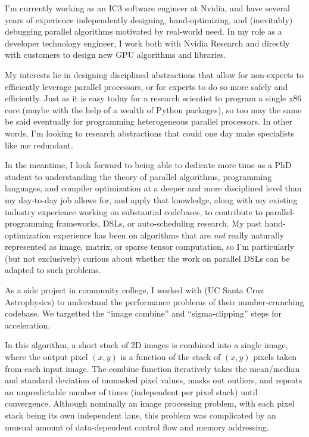 


\raggedright
\reversemarginpar

I'm currently working as an IC3 software engineer at Nvidia, and have
several years of experience independently designing, hand-optimizing,
and (inevitably) debugging parallel algorithms motivated by real-world
need. In my role as a developer technology engineer, I work both with
Nvidia Research and directly with customers to design new GPU
algorithms and libraries.

My interests lie in designing disciplined abstractions that allow for
non-experts to efficiently leverage parallel processors, or for
experts to do so more safely and efficiently. Just as it is easy today
for a research scientist to program a single x86 core (maybe with the
help of a wealth of Python packages), so too may the same be said
eventually for programming heterogeneous parallel processors. In other
words, I'm looking to research abstractions that could one day make
specialists like me redundant.

In the meantime, I look forward to being able to dedicate more time as
a PhD student to understanding the theory of parallel algorithms,
programming languages, and compiler optimization at a deeper and more
disciplined level than my day-to-day job allows for, and apply that
knowledge, along with my existing industry experience working on
substantial codebases, to contribute to parallel-programming
frameworks, DSLs, or auto-scheduling research. My past
hand-optimization experience has been on algorithms that
are \textit{not} really naturally represented as image, matrix, or
sparse tensor computation, so I'm particularly (but not exclusively)
curious about whether the work on parallel DSLs can be adapted to such
problems.

As a side project in community college, I worked
with  (UC Santa Cruz Astrophysics) to understand the performance
problems of their number-crunching codebase. We targetted the ``image
combine'' and ``sigma-clipping'' steps for acceleration.

In this algorithm, a short stack of 2D images is combined into a
single image, where the output pixel $(x,y)$ is a function of the
stack of $(x,y)$ pixels taken from each input image.  The combine
function iteratively takes the mean/median and standard deviation of
unmasked pixel values, masks out outliers, and repeats an
unpredictable number of times (independent per pixel stack) until
convergence. Although nominally an image processing problem, with each
pixel stack being its own independent lane, this problem was
complicated by an unusual amount of data-dependent control flow and
memory addressing.

